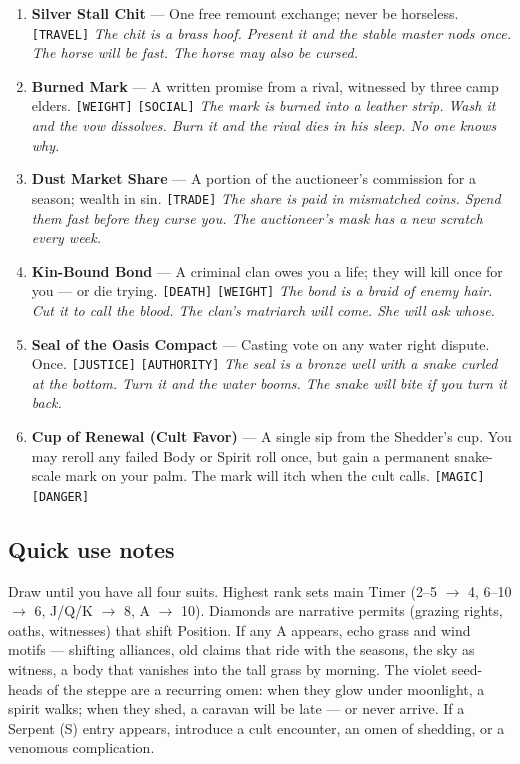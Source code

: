 {{\begin{enumerate}
\item {} \textbf{Silver Stall Chit} --- One free remount exchange; never be horseless. \texttt{[TRAVEL]} \hfill \textit{The chit is a brass hoof. Present it and the stable master nods once. The horse will be fast. The horse may also be cursed.}
\item {} \textbf{Burned Mark} --- A written promise from a rival, witnessed by three camp elders. \texttt{[WEIGHT]} \texttt{[SOCIAL]} \hfill \textit{The mark is burned into a leather strip. Wash it and the vow dissolves. Burn it and the rival dies in his sleep. No one knows why.}
\item {} \textbf{Dust Market Share} --- A portion of the auctioneer's commission for a season; wealth in sin. \texttt{[TRADE]} \hfill \textit{The share is paid in mismatched coins. Spend them fast before they curse you. The auctioneer's mask has a new scratch every week.}
\item {} \textbf{Kin-Bound Bond} --- A criminal clan owes you a life; they will kill once for you --- or die trying. \texttt{[DEATH]} \texttt{[WEIGHT]} \hfill \textit{The bond is a braid of enemy hair. Cut it to call the blood. The clan's matriarch will come. She will ask whose.}
\item {} \textbf{Seal of the Oasis Compact} --- Casting vote on any water right dispute. Once. \texttt{[JUSTICE]} \texttt{[AUTHORITY]} \hfill \textit{The seal is a bronze well with a snake curled at the bottom. Turn it and the water booms. The snake will bite if you turn it back.}
\item {} \textbf{Cup of Renewal (Cult Favor)} --- A single sip from the Shedder's cup. You may reroll any failed Body or Spirit roll once, but gain a permanent snake-scale mark on your palm. The mark will itch when the cult calls. \texttt{[MAGIC]} \texttt{[DANGER]}
\end{enumerate}

\subsection*{Quick use notes}
Draw until you have all four suits. Highest rank sets main Timer (2--5 $\rightarrow$ 4, 6--10 $\rightarrow$ 6, J/Q/K $\rightarrow$ 8, A $\rightarrow$ 10). Diamonds are narrative permits (grazing rights, oaths, witnesses) that shift Position. If any A appears, echo grass and wind motifs --- shifting alliances, old claims that ride with the seasons, the sky as witness, a body that vanishes into the tall grass by morning. The violet seed-heads of the steppe are a recurring omen: when they glow under moonlight, a spirit walks; when they shed, a caravan will be late --- or never arrive. If a Serpent (S) entry appears, introduce a cult encounter, an omen of shedding, or a venomous complication.

}}
